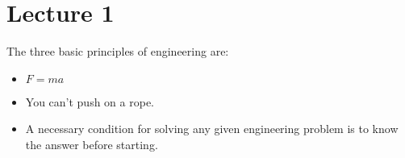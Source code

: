 \section{Lecture 1}
\begin{idea}
    The three basic principles of engineering are:
    \begin{itemize}
        \item $F=ma$
        \item You can't push on a rope.
        \item A necessary condition for solving any given engineering problem is to know the answer before starting.
    \end{itemize}
\end{idea}